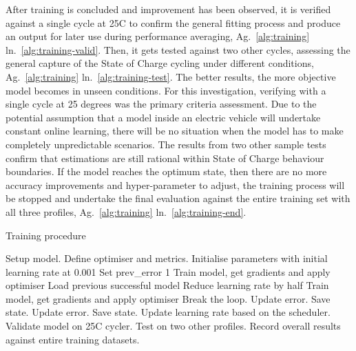 After training is concluded and improvement has been observed, it is verified against a single cycle at 25\textdegree{}C to confirm the general fitting process and produce an output for later use during performance averaging, Ag.~\ref{alg:training} ln.~\ref{alg:training-valid}.
Then, it gets tested against two other cycles, assessing the general capture of the State of Charge cycling under different conditions, Ag.~\ref{alg:training} ln.~\ref{alg:training-test}.
The better results, the more objective model becomes in unseen conditions.
For this investigation, verifying with a single cycle at 25 degrees was the primary criteria assessment.
Due to the potential assumption that a model inside an electric vehicle will undertake constant online learning, there will be no situation when the model has to make completely unpredictable scenarios.
The results from two other sample tests confirm that estimations are still rational within State of Charge behaviour boundaries.
If the model reaches the optimum state, then there are no more accuracy improvements and hyper-parameter to adjust, the training process will be stopped and undertake the final evaluation against the entire training set with all three profiles, Ag.~\ref{alg:training} ln.~\ref{alg:training-end}.
\begin{algorithm}
    \caption{Training procedure}
        \begin{algorithmic}[1]
            \STATE Setup model. Define optimiser and metrics.
            \STATE Initialise parameters with initial learning rate at 0.001
            \STATE Set prev\_error 1
                \STATE Train model, get gradients and apply optimiser
                    \label{alg:training-check}
                        \STATE Load previous successful model   \label{alg:training-recovery-start}
                        \STATE Reduce learning rate by half
                        \STATE Train model, get gradients and apply optimiser
                            \STATE Break the loop. Update error. Save state. \label{alg:training-recovery-end}
                        \ENDIF
                    \ENDWHILE
                \ELSE
                    \STATE Update error. Save state. \label{alg:training-succes}
                    \STATE Update learning rate based on the scheduler.
                \ENDIF
                \STATE Validate model on 25\textdegree{}C cycler.   \label{alg:training-valid}
                \STATE Test on two other profiles. \label{alg:training-test}
            \ENDWHILE
            \STATE Record overall results against entire training datasets. \label{alg:training-end}
        \end{algorithmic}
    \label{alg:training}
\end{algorithm}
